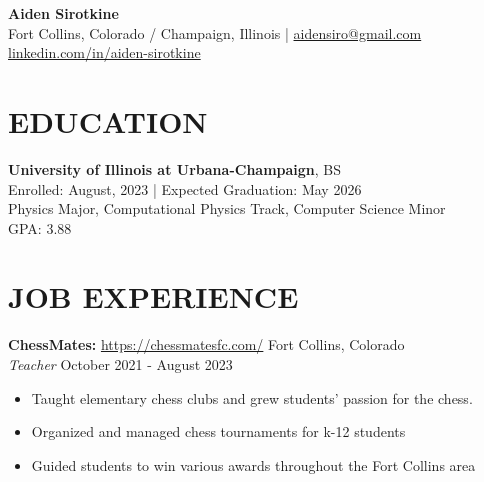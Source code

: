 \documentclass[a4paper,12pt]{extarticle}
\newcommand{\comment}[1]{}
\begin{document}
\pagestyle{empty}

\begin{center}
\textbf{\Large Aiden Sirotkine}\\[2pt] %
Fort Collins, Colorado / Champaign, Illinois | \href{mailto:aidensiro@gmail.com}{aidensiro@gmail.com} 
\href{https://www.linkedin.com/in/aiden-sirotkine-535630242/}{linkedin.com/in/aiden-sirotkine}
\comment{
| Country Citizen %
}
\end{center}

\section*{EDUCATION}
\noindent
\textbf{University of Illinois at Urbana-Champaign}, BS\\
Enrolled: August, 2023 | Expected Graduation: May 2026\\ %
Physics Major, Computational Physics Track, Computer Science Minor \hspace{1cm} \\
GPA: 3.88
\comment{
 | Major GPA X.XX\\ %
 }
\comment{
Threads: Example and Example \hfill Credit standing: Honors %
}

\section*{JOB EXPERIENCE}
\noindent
\textbf{ChessMates:} \hspace{0.05cm}
\href{https://chessmatesfc.com/}{https://chessmatesfc.com/}
\hfill Fort Collins, Colorado\\ %
\textit{Teacher} \hfill October 2021 - August 2023 %
\begin{itemize}
    \item Taught elementary chess clubs and grew students' passion for the chess. 
    \item Organized and managed chess tournaments for k-12 students
    \item Guided students to win various awards throughout the Fort Collins area
\end{itemize}

\comment{
\textbf{Club or Organization Name} \hfill City, State\\ %
\textit{Position Title} \hfill Month Year – Ongoing %
\begin{itemize}
    \item Description of responsibilities and achievements at this position. %
\end{itemize}
}
\end{document}
